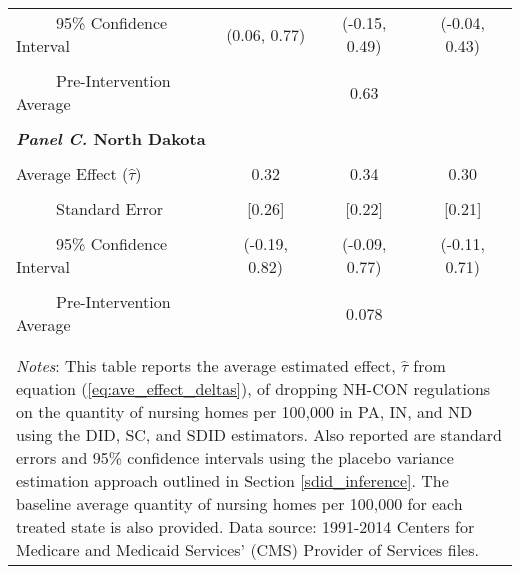 \documentclass[../Main.tex]{subfiles}
\begin{document}
\begin{table}[htbp]
\begin{tabular}{l*{3}{c}}
\\[-2ex]
\multicolumn{1}{l}{\ \ \ \ \ 95\% Confidence Interval}&   \multicolumn{1}{c}{(0.06, 0.77)}&   \multicolumn{1}{c}{(-0.15, 0.49)}&   \multicolumn{1}{c}{(-0.04, 0.43)}\\
\\[-2ex]
\multicolumn{1}{l}{\ \ \ \ \ Pre-Intervention Average}&   \multicolumn{3}{c}{0.63}\\
\\[-.1ex]
\multicolumn{4}{l}{\textbf{\textit{Panel C.} North Dakota}}\\
\\[-1.5ex]
\multicolumn{1}{l}{Average Effect ($\hat{\tau}$)}&   \multicolumn{1}{c}{0.32}&   \multicolumn{1}{c}{0.34}&  \multicolumn{1}{c}{0.30}\\
\\[-2ex]
\multicolumn{1}{l}{\ \ \ \ \ Standard Error}  &\multicolumn{1}{c}{[0.26]}&\multicolumn{1}{c}{[0.22]}&\multicolumn{1}{c}{[0.21]}\\
\\[-2ex]
\multicolumn{1}{l}{\ \ \ \ \ 95\% Confidence Interval}&   \multicolumn{1}{c}{(-0.19, 0.82)}&   \multicolumn{1}{c}{(-0.09, 0.77)}&   \multicolumn{1}{c}{(-0.11, 0.71)}\\
\\[-2ex]
\multicolumn{1}{l}{\ \ \ \ \ Pre-Intervention Average}&   \multicolumn{3}{c}{0.078}\\
\\[-.1ex]
\hline\hline
\\[-2ex]
\multicolumn{4}{p{.69\linewidth}}{\footnotesize \textit{Notes}: This table reports the average estimated effect, $\hat{\tau}$ from equation (\ref{eq:ave_effect_deltas}), of dropping NH-CON regulations on the quantity of nursing homes per 100,000 in PA, IN, and ND using the DID, SC, and SDID estimators. Also reported are standard errors and 95\% confidence intervals using the placebo variance estimation approach outlined in Section \ref{sdid_inference}. The baseline average quantity of nursing homes per 100,000 for each treated state is also provided. Data source: 1991-2014 Centers for Medicare and Medicaid Services’ (CMS) Provider of Services files.}
\end{tabular}
\end{table}
\vfill
\clearpage
\end{document}
